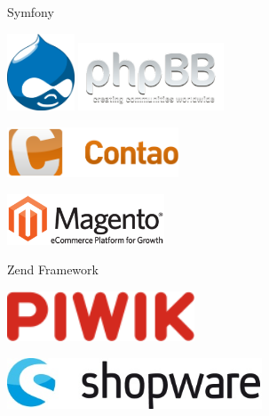 \begin{frame}{Symfony}
	\begin{center}
		\includegraphics[width=2cm]{img/symfony/drupal.png}
		\hspace{2cm}
		\includegraphics[height=2cm]{img/symfony/phpbb.png}
	\end{center}

	\begin{center}
		\includegraphics[height=1.5cm]{img/symfony/contao.png}
	\end{center}
	
	\begin{center}
		\includegraphics[height=1.5cm]{img/symfony/magento.png}
	\end{center}
\end{frame}

\begin{frame}{Zend Framework}
	\begin{center}
		\includegraphics[height=1.5cm]{img/zend/piwik.png}
	\end{center}
	
	\begin{center}
		\includegraphics[height=1.5cm]{img/zend/shopware.jpg}
	\end{center}
\end{frame}

